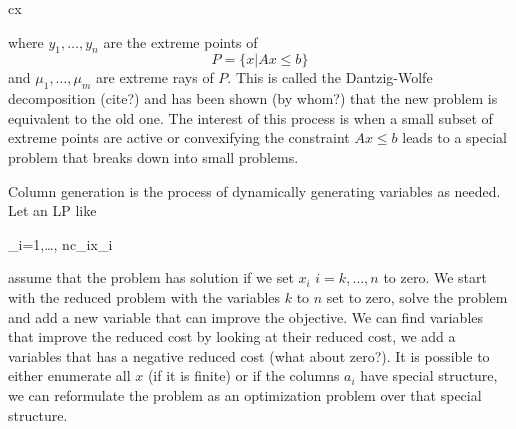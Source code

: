 \documentclass{article}
\begin{document}
	\begin{mini!}
		{}{c\cdot x}{}{}
	\end{mini!}
	where $y_1,\ldots,y_n$ are the extreme points of 
	\begin{equation}
		P = \{x | Ax \leq b\}
	\end{equation}
	and $\mu_1,\ldots,\mu_m$ are extreme rays of $P$. This is called the Dantzig-Wolfe decomposition (cite?) and has been shown (by whom?) that the new problem is equivalent to the old one. The interest of this process is when a small subset of extreme points are active or convexifying the constraint $Ax \leq b$ leads to a special problem that breaks down into small problems.
	
	
	
	Column generation is the process of dynamically generating variables as needed. Let an LP like 
	\begin{mini!}
		{}{\sum_{i=1,\ldots, n}c_ix_i}{}{}
		\addConstraint{\sum_{i=1,\ldots, n} a^j_ix_i}{\leq b^j}{\quad j \in 1,\ldots,m,}
	\end{mini!}
 	assume that the problem has solution if we set $x_i$ $i=k,\ldots,n$ to zero. We start with the reduced problem with the variables $k$ to $n$ set to zero, solve the problem and add a new variable that can improve the objective. We can find variables that improve the reduced cost by looking at their reduced cost, we add a variables that has a negative reduced cost (what about zero?). It is possible to either enumerate all $x$ (if it is finite) or if the columns $a_i$ have special structure, we can reformulate the problem as an optimization problem over that special structure.
 	
\end{document}
